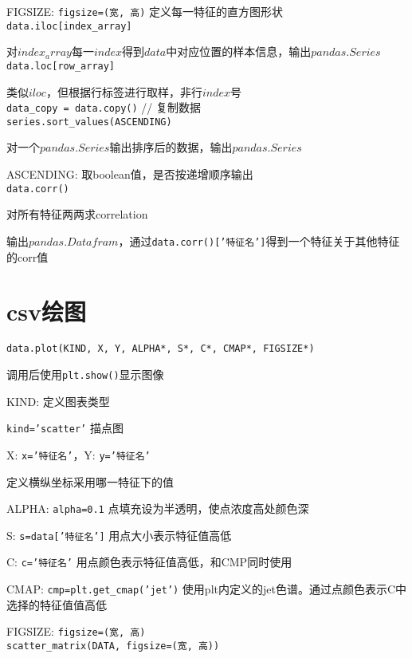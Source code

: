 \documentclass[UTF8]{ctexart}
\begin{document}
  FIGSIZE: \texttt{figsize=(宽, 高)} 定义每一特征的直方图形状\\
\texttt{data.iloc[index\_array]}

  对$index_array$每一$index$得到$data$中对应位置的样本信息，输出$pandas.Series$\\
\texttt{data.loc[row\_array]}

  类似$iloc$，但根据行标签进行取样，非行$index$号\\
\texttt{data\_copy = data.copy()} // 复制数据\\
\texttt{series.sort\_values(ASCENDING)}

  对一个$pandas.Series$输出排序后的数据，输出$pandas.Series$

  ASCENDING: 取boolean值，是否按递增顺序输出\\
\texttt{data.corr()} 
  
  对所有特征两两求correlation

  输出$pandas.Datafram$，通过\texttt{data.corr()['特征名']}得到一个特征关于其他特征的corr值

\section{csv绘图}
\noindent \texttt{data.plot(KIND, X, Y, ALPHA*, S*, C*, CMAP*, FIGSIZE*)}

  调用后使用\texttt{plt.show()}显示图像

  KIND: 定义图表类型
  
  \quad \texttt{kind='scatter'} 描点图

  X: \texttt{x='特征名'}，Y: \texttt{y='特征名'}

  \quad 定义横纵坐标采用哪一特征下的值

  ALPHA: \texttt{alpha=0.1} 点填充设为半透明，使点浓度高处颜色深

  S: \texttt{s=data['特征名']} 用点大小表示特征值高低
  
  C: \texttt{c='特征名'} 用点颜色表示特征值高低，和CMP同时使用

  CMAP: \texttt{cmp=plt.get\_cmap('jet')} 使用plt内定义的jet色谱。通过点颜色表示C中选择的特征值值高低

  FIGSIZE: \texttt{figsize=(宽, 高)}\\
\texttt{scatter\_matrix(DATA, figsize=(宽, 高))}
\end{document}
